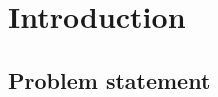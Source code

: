 \chapter{Introduction}
\label{chp:introduction}

\section{Problem statement}
\label{sec:problem_statement}
